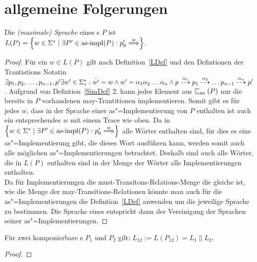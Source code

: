 \chapter{allgemeine Folgerungen}

\begin{Prop}
  Die \emph{(maximale) Sprache} eines \MEIO{}s $P$ ist $L(P) = \left\{w\in
  \Sigma ^* \mid \exists P'\in\asimp (P) : p'_0\weakmust[w]
  \right\}$.
\end{Prop}

\begin{proof}
  Für ein $w\in L(P)$ gilt nach Definition~\ref{LDef} und den
  Defintionen der Trantistions Notatin $\exists p_1,p_2,\dots,p_{n-1},p' \exists
  w'\in\Sigma _{\tau} ^* : \hat{w'} = w \land w'=\alpha _1\alpha _2\dots\alpha
  _n \land p\may[\alpha _1]p_1\may[\alpha _2] \dots p_{n-1}\may[\alpha _n] p'$.
  Aufgrund von Defintion~\ref{SimDef} 2. kann jedes Element aus $\sqsubseteq _{\mathrm{as}} (P)$
  nur die bereits in $P$ vorhandenen may-Trantitionen implementieren. Somit
  gibt es für jedes $w$, dass in der Sprache einer as"=Implementierung von $P$
  enthalten ist auch ein entsprechendes $w$ mit einem Trace wie oben. Da in
  $\left\{w\in \Sigma ^* \mid \exists P'\in\asimp (P) : p'_0\weakmust[w]
  \right\}$ alle Wörter enthalten sind, für dies es eine as"=Implementierung
  gibt, die dieses Wort ausführen kann, werden somit auch alle möglichen
  as"=Implementierungen betrachtet. Deshalb sind auch alle Wörter, die in
  $L(P)$ enthalten sind in der Menge der Wörter alle Implementierungen
  enthalten.\\
  Da für Implementierungen die must-Transitons-Relations-Menge die gleiche ist,
  wie die Menge der may-Transitions-Relationen könnte man auch für die
  as"=Implementierungen die Defintion~\ref{LDef} anwenden um die jeweilige
  Sprache zu bestimmen. Die Sprache eines \MEIO{} entspricht dann der
  Vereinigung der Sprachen seiner as"=Implementierungen.
\end{proof}

\begin{Prop}
  Für zwei komponierbare \MEIO{}s $P_1$ und $P_2$ gilt: $L_{12} := L(P_{12}) =
  L_1\|L_2$.
\end{Prop}

\begin{proof}
\end{proof}

